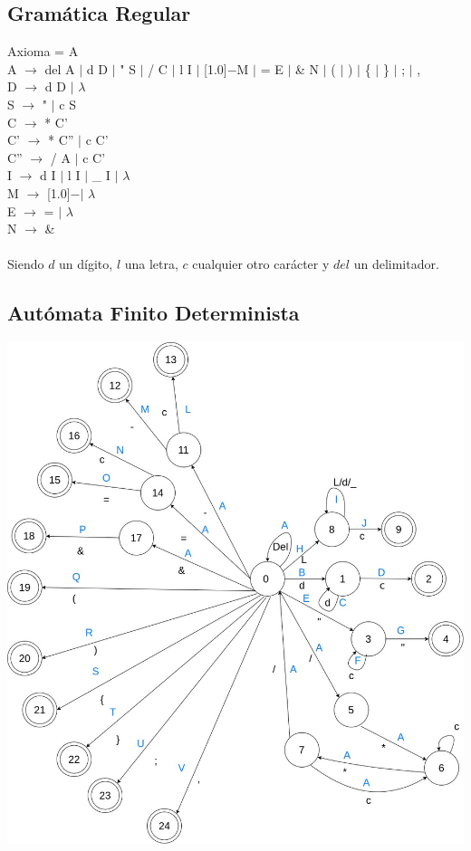 \documentclass[11pt, , a4paper, titlepage]{article}
\newcommand{\minus}{\scalebox{0.75}[1.0]{$-$}}
\begin{document}
\subsection{Gramática Regular}
\noindent
Axioma = A\\
A $\rightarrow$ del A $|$ d D $|$ " \hspace{1mm} S $|$ / C $|$ l I $|$ \minus  M $|$ = E $|$ \& N $|$ ( $|$ ) $|$ \{ $|$ \} $|$ ; $|$ , \\
D $\rightarrow$ d D $|$ $\lambda$\\
S $\rightarrow$ " \hspace{1mm} $|$ c S\\
C $\rightarrow$ * C'\\
C' $\rightarrow$ * C'' $|$ c C'\\
C'' $\rightarrow$ / A $|$ c C'\\
I $\rightarrow$ d I $|$ l I $|$ \_ I $|$ $\lambda$\\
M $\rightarrow$ \minus \hspace{1.5mm}$|$ $\lambda$\\
E $\rightarrow$ = $|$ $\lambda$\\
N $\rightarrow$ \&\\
\\
Siendo $d$ un dígito, $l$ una letra, $c$ cualquier otro carácter y $del$ un delimitador.

\subsection{Autómata Finito Determinista}
\begin{center}
    \includegraphics[scale=0.33]{./resources/automata.jpg}
\end{center}
\clearpage
\end{document}
